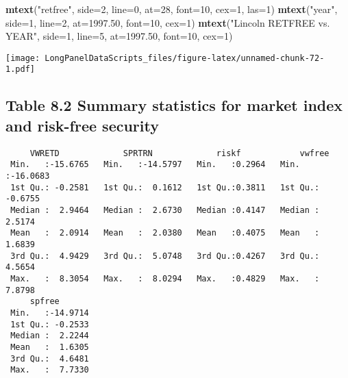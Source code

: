 \documentclass[]{book}
\newenvironment{Shaded}{\begin{snugshade}}{\end{snugshade}}
\newcommand{\DataTypeTok}[1]{\textcolor[rgb]{0.13,0.29,0.53}{#1}}
\newcommand{\DecValTok}[1]{\textcolor[rgb]{0.00,0.00,0.81}{#1}}
\newcommand{\FloatTok}[1]{\textcolor[rgb]{0.00,0.00,0.81}{#1}}
\newcommand{\KeywordTok}[1]{\textcolor[rgb]{0.13,0.29,0.53}{\textbf{#1}}}
\newcommand{\NormalTok}[1]{#1}
\newcommand{\OperatorTok}[1]{\textcolor[rgb]{0.81,0.36,0.00}{\textbf{#1}}}
\newcommand{\StringTok}[1]{\textcolor[rgb]{0.31,0.60,0.02}{#1}}
\begin{document}
\begin{Shaded}
\begin{Highlighting}[]
\KeywordTok{mtext}\NormalTok{(}\StringTok{"retfree"}\NormalTok{, }\DataTypeTok{side=}\DecValTok{2}\NormalTok{, }\DataTypeTok{line=}\DecValTok{0}\NormalTok{, }\DataTypeTok{at=}\DecValTok{28}\NormalTok{, }\DataTypeTok{font=}\DecValTok{10}\NormalTok{, }\DataTypeTok{cex=}\DecValTok{1}\NormalTok{, }\DataTypeTok{las=}\DecValTok{1}\NormalTok{)}
\KeywordTok{mtext}\NormalTok{(}\StringTok{"year"}\NormalTok{, }\DataTypeTok{side=}\DecValTok{1}\NormalTok{, }\DataTypeTok{line=}\DecValTok{2}\NormalTok{, }\DataTypeTok{at=}\FloatTok{1997.50}\NormalTok{, }\DataTypeTok{font=}\DecValTok{10}\NormalTok{, }\DataTypeTok{cex=}\DecValTok{1}\NormalTok{)}
\KeywordTok{mtext}\NormalTok{(}\StringTok{"Lincoln RETFREE vs. YEAR"}\NormalTok{, }\DataTypeTok{side=}\DecValTok{1}\NormalTok{, }\DataTypeTok{line=}\DecValTok{5}\NormalTok{, }\DataTypeTok{at=}\FloatTok{1997.50}\NormalTok{, }\DataTypeTok{font=}\DecValTok{10}\NormalTok{, }\DataTypeTok{cex=}\DecValTok{1}\NormalTok{)}
\end{Highlighting}
\end{Shaded}

\texttt{[image: LongPanelDataScripts\_files/figure-latex/unnamed-chunk-72-1.pdf]}

\hypertarget{table-8.2-summary-statistics-for-market-index-and-risk-free-security}{%
\subsection{Table 8.2 Summary statistics for market index and risk-free security}\label{table-8.2-summary-statistics-for-market-index-and-risk-free-security}}

\begin{Shaded}
\end{Shaded}

\begin{verbatim}
     VWRETD             SPRTRN             riskf            vwfree        
 Min.   :-15.6765   Min.   :-14.5797   Min.   :0.2964   Min.   :-16.0683  
 1st Qu.: -0.2581   1st Qu.:  0.1612   1st Qu.:0.3811   1st Qu.: -0.6755  
 Median :  2.9464   Median :  2.6730   Median :0.4147   Median :  2.5174  
 Mean   :  2.0914   Mean   :  2.0380   Mean   :0.4075   Mean   :  1.6839  
 3rd Qu.:  4.9429   3rd Qu.:  5.0748   3rd Qu.:0.4267   3rd Qu.:  4.5654  
 Max.   :  8.3054   Max.   :  8.0294   Max.   :0.4829   Max.   :  7.8798  
     spfree        
 Min.   :-14.9714  
 1st Qu.: -0.2533  
 Median :  2.2244  
 Mean   :  1.6305  
 3rd Qu.:  4.6481  
 Max.   :  7.7330  
\end{verbatim}
\end{document}

